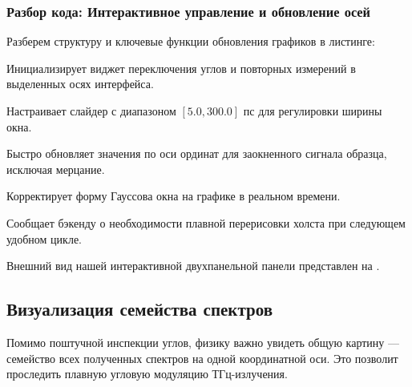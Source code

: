 \subsubsection{Разбор кода: Интерактивное управление и обновление осей}

Разберем структуру и ключевые функции обновления графиков в листинге:

\begin{syntaxdesc}
    \item[Создание переключателей \mycode{RadioButtons(ax_radio_angle, ...)}] Инициализирует виджет переключения углов и повторных измерений в выделенных осях интерфейса.
    \item[Создание слайдера \mycode{Slider(ax_slider_sigma, ...)}] Настраивает слайдер с диапазоном $[5.0, 300.0]$ пс для регулировки ширины окна.
    \item[Локальное обновление \mycode{line_sig.set_ydata(E_s_win)}] Быстро обновляет значения по оси ординат для заокненного сигнала образца, исключая мерцание.
    \item[Обновление огибающей \mycode{line_win.set_ydata(w)}] Корректирует форму Гауссова окна на графике в реальном времени.
    \item[Запрос перерисовки \mycode{fig.canvas.draw_idle()}] Сообщает бэкенду о необходимости плавной перерисовки холста при следующем удобном цикле.
\end{syntaxdesc}


Внешний вид нашей интерактивной двухпанельной панели представлен на .


\subsection{Визуализация семейства спектров}

Помимо поштучной инспекции углов, физику важно увидеть общую картину --- семейство всех полученных спектров на одной координатной оси. Это позволит проследить плавную угловую модуляцию ТГц-излучения.

